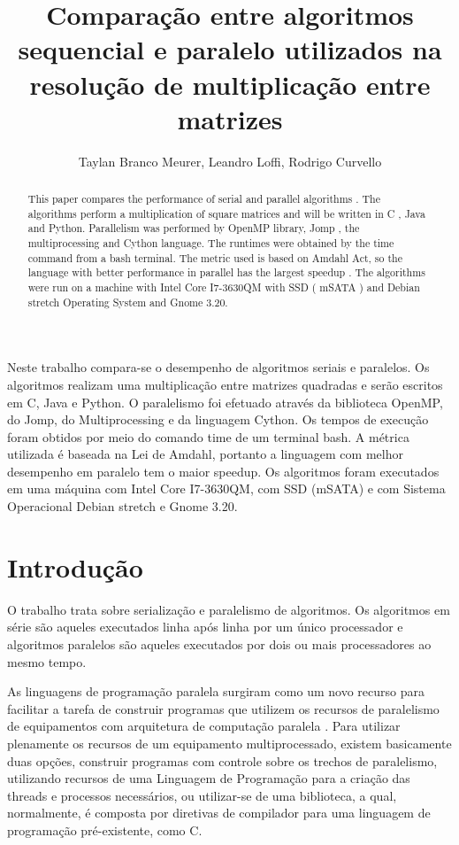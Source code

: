 \documentclass[a4paper,12pt]{article}
\title{Comparação entre algoritmos sequencial e paralelo utilizados na resolução de multiplicação entre matrizes\\}
\author{Taylan Branco Meurer\inst{1}, Leandro Loffi\inst{1}, Rodrigo Curvello\inst{2}}
\begin{document}
 

\maketitle

\begin{abstract}
This paper compares the performance of serial and parallel algorithms . The algorithms perform a multiplication of square matrices and will be written in C , Java and Python. Parallelism was performed by OpenMP library, Jomp , the multiprocessing and Cython language. The runtimes were obtained by the time command from a bash terminal. The metric used is based on Amdahl Act, so the language with better performance in parallel has the largest speedup . The algorithms were run on a machine with Intel Core I7-3630QM with SSD ( mSATA ) and Debian stretch Operating System and Gnome 3.20. 
\end{abstract}

\begin{resumo}
Neste trabalho compara-se o desempenho de algoritmos seriais e paralelos. Os algoritmos realizam uma multiplicação entre matrizes quadradas e serão escritos em C, Java e Python. O paralelismo foi efetuado através da biblioteca OpenMP, do Jomp, do Multiprocessing e da linguagem Cython. Os tempos de execução foram obtidos por meio do comando time de um terminal bash. A métrica utilizada é baseada na Lei de Amdahl, portanto a linguagem com melhor desempenho em paralelo tem o maior speedup. Os algoritmos foram executados em uma máquina com Intel Core I7-3630QM, com SSD (mSATA) e com Sistema Operacional Debian stretch e Gnome 3.20.
\end{resumo}
\section{Introdução}

O trabalho trata sobre serialização e paralelismo de algoritmos. Os algoritmos em série são aqueles executados linha após linha por um único processador e algoritmos paralelos são aqueles executados por dois ou mais processadores ao mesmo tempo. 

	As linguagens de programação paralela surgiram como um novo recurso para facilitar a tarefa de construir programas que utilizem os recursos de paralelismo de equipamentos com arquitetura de computação paralela \cite{sato}. Para utilizar plenamente os recursos de um equipamento multiprocessado, existem basicamente duas opções, construir programas com controle sobre os trechos de paralelismo, utilizando recursos de uma Linguagem de Programação para a criação das threads e processos necessários, ou utilizar-se de uma biblioteca, a qual, normalmente, é composta por diretivas de compilador para uma linguagem de programação pré-existente, como C.
	 
\end{document}
